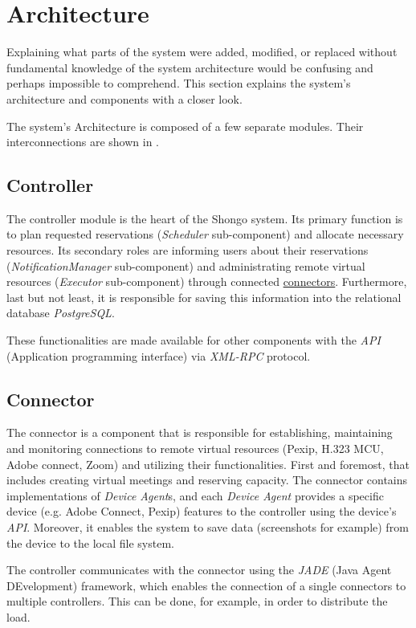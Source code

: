 \section{Architecture}
Explaining what parts of the system were added, modified, or replaced without fundamental knowledge of the system architecture would be confusing and perhaps impossible to comprehend. This section explains the system’s architecture and components with a closer look.

The system's Architecture is composed of a few separate modules. Their interconnections are shown in .

\subsection{Controller} \label{controller}
The controller module is the heart of the Shongo system.
Its primary function is to plan requested reservations (\emph{Scheduler} sub-component) and allocate necessary resources.
Its secondary roles are informing users about their reservations (\emph{NotificationManager} sub-component) and administrating remote virtual resources (\emph{Executor} sub-component) through connected \hyperref[connector]{connectors}.
Furthermore, last but not least, it is responsible for saving this information into the relational database \emph{PostgreSQL}.

These functionalities are made available for other components with the \emph{API} (Application programming interface) via \emph{XML-RPC} protocol.

\subsection{Connector} \label{connector}
The connector is a component that is responsible for establishing, maintaining and monitoring connections to remote virtual resources (Pexip, H.323 MCU, Adobe connect, Zoom) and utilizing their functionalities. First and foremost, that includes creating virtual meetings and reserving capacity.
The connector contains implementations of \emph{Device Agent}s, and each \emph{Device Agent} provides a specific device (e.g. Adobe Connect, Pexip) features to the controller using the device’s \emph{API}.
Moreover, it enables the system to save data (screenshots for example) from the device to the local file system.

The controller communicates with the connector using the \emph{JADE} (Java Agent DEvelopment) framework, which enables the connection of a single connectors to multiple controllers. This can be done, for example, in order to distribute the load.

